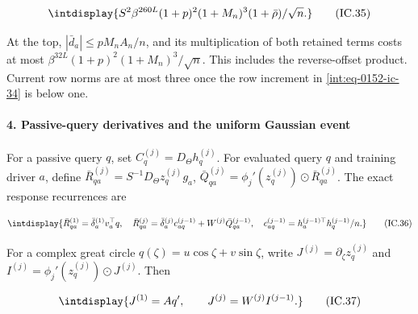 \begingroup\renewcommand{\theHequation}{intdisplay.335}
\begin{equation}
\intdisplay{
S^2\beta^{260L}(1+p)^2(1+M_n)^3(1+\bar\rho)/\sqrt n.
}
\tag{IC.35}
\label{int:eq-0153-ic-35}
\end{equation}
\endgroup


At the top, \(|\bar d_a|\le pM_nA_n/n\), and its multiplication of both retained terms costs at most \(\beta^{32L}(1+p)^2(1+M_n)^3/\sqrt n\). This includes the reverse-offset product. Current row norms are at most three once the row increment in \eqref{int:eq-0152-ic-34} is below one.


\paragraph{4. Passive-query derivatives and the uniform Gaussian event}
\label{int:source-passive-local}

\mbox{}\par\smallskip


For a passive query \(q\), set \(C_q^{(j)}=D_\Theta h_q^{(j)}\). For evaluated query \(q\) and training driver \(a\), define \(\bar R_{qa}^{(j)}=S^{-1}D_\Theta z_q^{(j)}g_a\), \(\bar Q_{qa}^{(j)}=\phi_j'(z_q^{(j)})\odot\bar R_{qa}^{(j)}\). The exact response recurrences are


\begingroup\renewcommand{\theHequation}{intdisplay.336}
\begin{equation}
\intdisplay{
\bar R_{qa}^{(1)}=\bar\delta_a^{(1)}v_a^\top q,
 \quad\bar R_{qa}^{(j)}=
 \bar\delta_a^{(j)}c_{aq}^{(j-1)}+W^{(j)}\bar Q_{qa}^{(j-1)},
 \quad c_{aq}^{(j-1)}=h_a^{(j-1)\top}h_q^{(j-1)}/n.
}
\tag{IC.36}
\label{int:eq-0154-ic-36}
\end{equation}
\endgroup


For a complex great circle \(q(\zeta)=u\cos\zeta+v\sin\zeta\), write \(J^{(j)}=\partial_\zeta z_q^{(j)}\) and \(I^{(j)}=\phi_j'(z_q^{(j)})\odot J^{(j)}\). Then


\begingroup\renewcommand{\theHequation}{intdisplay.337}
\begin{equation}
\intdisplay{
J^{(1)}=Aq',\qquad J^{(j)}=W^{(j)}I^{(j-1)}.
}
\tag{IC.37}
\label{int:eq-0155-ic-37}
\end{equation}
\endgroup


